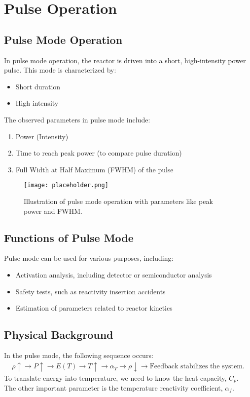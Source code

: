 \section{Pulse Operation}

\subsection{Pulse Mode Operation}
In pulse mode operation, the reactor is driven into a short, high-intensity power pulse. This mode is characterized by:
\begin{itemize}
    \item Short duration
    \item High intensity
\end{itemize}
The observed parameters in pulse mode include:
\begin{enumerate}
    \item Power (Intensity)
    \item Time to reach peak power (to compare pulse duration)
    \item Full Width at Half Maximum (FWHM) of the pulse
\end{enumerate}

\begin{figure}[h]
    \centering
    \texttt{[image: placeholder.png]}
    \caption{Illustration of pulse mode operation with parameters like peak power and FWHM.}
    \label{fig:pulse_mode}
\end{figure}

\subsection{Functions of Pulse Mode}
Pulse mode can be used for various purposes, including:
\begin{itemize}
    \item Activation analysis, including detector or semiconductor analysis
    \item Safety tests, such as reactivity insertion accidents
    \item Estimation of parameters related to reactor kinetics
\end{itemize}

\subsection{Physical Background}
In the pulse mode, the following sequence occurs:
\begin{align*}
    \rho \uparrow \to P \uparrow \to E(T) \to T \uparrow \to \alpha_T \to \rho \downarrow \to \text{Feedback stabilizes the system.}
\end{align*}
To translate energy into temperature, we need to know the heat capacity, $C_p$. The other important parameter is the temperature reactivity coefficient, $\alpha_f$.

